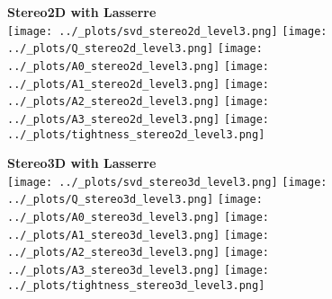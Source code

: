 \documentclass[11pt]{article}
\begin{document}
\begin{figure}[h]
  \centering
  \textbf{\large{Stereo2D with Lasserre}} \\
  \vspace{2em}
  \texttt{[image: ../\_plots/svd\_stereo2d\_level3.png]}
  \texttt{[image: ../\_plots/Q\_stereo2d\_level3.png]}
  \texttt{[image: ../\_plots/A0\_stereo2d\_level3.png]}
  \texttt{[image: ../\_plots/A1\_stereo2d\_level3.png]}
  \texttt{[image: ../\_plots/A2\_stereo2d\_level3.png]}
  \texttt{[image: ../\_plots/A3\_stereo2d\_level3.png]}
  \texttt{[image: ../\_plots/tightness\_stereo2d\_level3.png]}
  \label{fig:noise}
\end{figure}

\begin{figure}[h]
  \centering
  \textbf{\large{Stereo3D with Lasserre}} \\
  \vspace{2em}
  \texttt{[image: ../\_plots/svd\_stereo3d\_level3.png]}
  \texttt{[image: ../\_plots/Q\_stereo3d\_level3.png]}
  \texttt{[image: ../\_plots/A0\_stereo3d\_level3.png]}
  \texttt{[image: ../\_plots/A1\_stereo3d\_level3.png]}
  \texttt{[image: ../\_plots/A2\_stereo3d\_level3.png]}
  \texttt{[image: ../\_plots/A3\_stereo3d\_level3.png]}
  \texttt{[image: ../\_plots/tightness\_stereo3d\_level3.png]}
  \label{fig:noise}
\end{figure}
\end{document}
